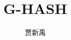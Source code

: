 \documentclass{article}
\title{G-HASH\cite{G-HASH}}
\author{贾新禹}
\begin{document}
\maketitle
\tableofcontents








\renewcommand\refname{参考文献}


\end{document}
